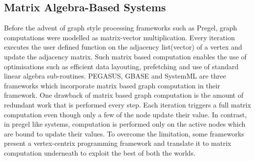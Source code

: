\subsection{Matrix Algebra-Based Systems} \label{gmat}
Before the advent of graph style processing frameworks such as Pregel, graph computations were modelled as matrix-vector multiplication. Every iteration executes the user defined function on the adjacency list(vector) of a vertex and update the adjacency matrix. Such matrix based computation enables the use of optimisations such as efficient data layouting, prefetching and use of standard linear algebra sub-routines. PEGASUS, GBASE and SystemML are three frameworks which incorporate matrix based graph computation in their framework. One drawback of matrix based graph computation is the amount of redundant work that is performed every step. Each iteration triggers a full matrix computation even though only a few of the node update their value. In contrast, in pregel like systems, computation is performed only on the active nodes which are bound to update their values. To overcome the limitation, some frameworks present a vertex-centrix programming framework and translate it to matrix computation underneath to exploit the best of both the worlds.